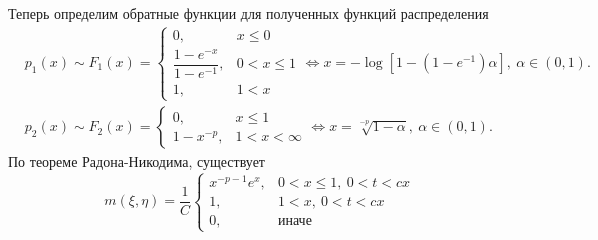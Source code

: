 \documentclass{article}
\begin{document}
	Теперь определим обратные функции для полученных функций распределения
	\begin{align*}
		&p_1(x)\sim F_1(x)=\begin{cases}
			0,&x\leqslant0\\
			\dfrac{1-e^{-x}}{1-e^{-1}},&0<x\leqslant 1\\
			1,&1<x
		\end{cases}\Leftrightarrow x = -\log[1-(1-e^{-1})\alpha],~\alpha\in(0,1).\\
		&p_2(x)\sim F_2(x)=\begin{cases}
			0,&x\leqslant1\\
			1-x^{-p},&1<x<\infty
		\end{cases}\Leftrightarrow x = \sqrt[-p]{1-\alpha},~\alpha\in(0,1).
	\end{align*}
	 По теореме Радона-Никодима, существует
	\begin{equation*}
		m(\xi, \eta)=\dfrac{1}{C}\begin{cases}
			x^{-p-1}e^x,&0<x\leqslant1,~0<t<cx\\
			1,&1<x,~0<t<cx\\
			0,&\text{иначе}
		\end{cases}
	\end{equation*} 
	
	
\end{document}
